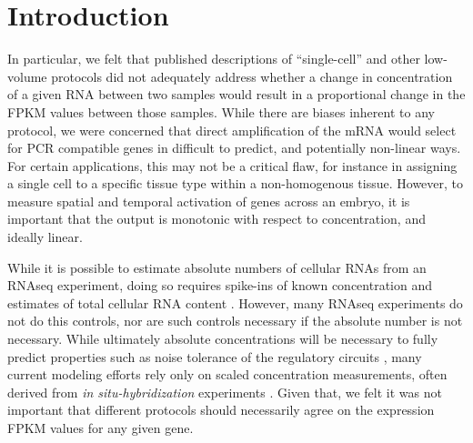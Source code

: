 \section{Introduction}


In particular, we felt that published descriptions of ``single-cell'' and other low-volume protocols did not adequately address whether a change in concentration of a given RNA between two samples would result in a proportional change in the FPKM values between those samples. While there are biases inherent to any protocol, we were concerned that direct amplification of the mRNA would select for PCR compatible genes in difficult to predict, and potentially non-linear ways.  For certain applications, this may not be a critical flaw, for instance in assigning a single cell to a specific tissue type within a non-homogenous tissue.  However, to measure spatial and temporal activation of genes across an embryo, it is important that the output is monotonic with respect to concentration, and ideally linear.


While it is possible to estimate absolute numbers of cellular RNAs from an RNAseq experiment, doing so requires spike-ins of known concentration and estimates of total cellular RNA content \cite{Mortazavi:2008jj}. However, many RNAseq experiments do not do this controls, nor are such controls necessary if the absolute number is not necessary. While ultimately absolute concentrations will be necessary to fully predict properties such as noise tolerance of the regulatory circuits \cite{Gregor:2007du,Gregor:2005jn}, many current modeling efforts rely only on scaled concentration measurements, often derived from {\em in situ-hybridization} experiments \cite{Garcia:2013fs,Ilsley:2013fk,He:2010ix}.  Given that, we felt it was not important that different protocols should necessarily agree on the expression FPKM values for any given gene.
